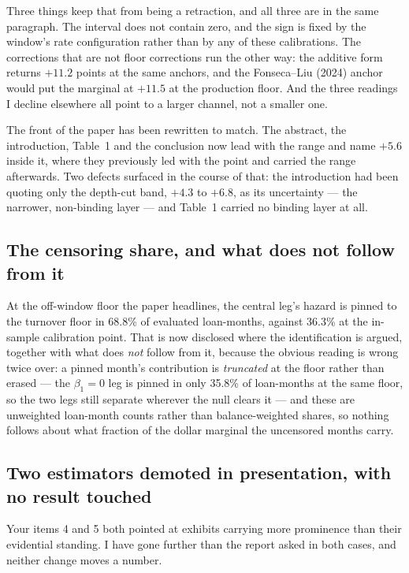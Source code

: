 \documentclass[11pt]{article}
\begin{document}
Three things keep that from being a retraction, and all three are in the same
paragraph. The interval does not contain zero, and the sign is fixed by the window's
rate configuration rather than by any of these calibrations. The corrections that are
not floor corrections run the other way: the additive form returns $+11.2$ points at
the same anchors, and the Fonseca--Liu (2024) anchor would put the marginal at $+11.5$
at the production floor. And the three readings I decline elsewhere all point to a
larger channel, not a smaller one.

The front of the paper has been rewritten to match. The abstract, the introduction,
Table~1 and the conclusion now lead with the range and name $+5.6$ inside it, where
they previously led with the point and carried the range afterwards. Two defects
surfaced in the course of that: the introduction had been quoting only the depth-cut
band, $+4.3$ to $+6.8$, as its uncertainty --- the narrower, non-binding layer --- and
Table~1 carried no binding layer at all.

\subsection{The censoring share, and what does not follow from it}

At the off-window floor the paper headlines, the central leg's hazard is pinned to the
turnover floor in 68.8\% of evaluated loan-months, against 36.3\% at the in-sample
calibration point. That is now disclosed where the identification is argued, together
with what does \emph{not} follow from it, because the obvious reading is wrong twice
over: a pinned month's contribution is \emph{truncated} at the floor rather than
erased --- the $\beta_1 = 0$ leg is pinned in only 35.8\% of loan-months at the same
floor, so the two legs still separate wherever the null clears it --- and these are
unweighted loan-month counts rather than balance-weighted shares, so nothing follows
about what fraction of the dollar marginal the uncensored months carry.

\subsection{Two estimators demoted in presentation, with no result touched}

Your items 4 and 5 both pointed at exhibits carrying more prominence than their
evidential standing. I have gone further than the report asked in both cases, and
neither change moves a number.
\end{document}
